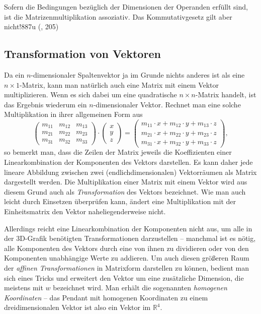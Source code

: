 Sofern die Bedingungen bezüglich der Dimensionen der Operanden erfüllt sind, ist die Matrizenmultiplikation assoziativ. Das Kommutativgesetz gilt aber nicht!887u (\vgl \citep{bronstein}, 205)

\subsection{Transformation von Vektoren}
Da ein $n$-dimensionaler Spaltenvektor ja im Grunde nichts anderes ist als eine $n \times 1$-Matrix, kann man natürlich auch eine Matrix mit einem Vektor multiplizieren. Wenn es sich dabei um eine quadratische $n \times n$-Matrix handelt, ist das Ergebnis wiederum ein $n$-dimensionaler Vektor. Rechnet man eine solche Multiplikation in ihrer allgemeinen Form aus
\begin{equation}
 \begin{pmatrix}
  m_{11} & m_{12} & m_{13} \\
  m_{21} & m_{22} & m_{23} \\
  m_{31} & m_{32} & m_{33}
 \end{pmatrix} \cdot
 \begin{pmatrix}
  x \\ y \\ z
 \end{pmatrix} =
 \begin{pmatrix}
  m_{11} \cdot x + m_{12} \cdot y + m_{13} \cdot z \\
  m_{21} \cdot x + m_{22} \cdot y + m_{23} \cdot z \\
  m_{31} \cdot x + m_{32} \cdot y + m_{33} \cdot z
 \end{pmatrix},
\end{equation}
so bemerkt man, dass die Zeilen der Matrix jeweils die Koeffizienten einer Linearkombination der Komponenten des Vektors darstellen. Es kann daher jede lineare Abbildung zwischen zwei (endlichdimensionalen) Vektorräumen als Matrix dargestellt werden. Die Multiplikation einer Matrix mit einem Vektor wird aus diesem Grund auch als \emph{Transformation} des Vektors bezeichnet. Wie man auch leicht durch Einsetzen überprüfen kann, ändert eine Multiplikation mit der Einheitsmatrix den Vektor naheliegenderweise nicht.

\label{homogeneouscoordinates}
Allerdings reicht eine Linearkombination der Komponenten nicht aus, um alle in der 3D-Grafik benötigten Transformationen darzustellen -- manchmal ist es nötig, alle Komponenten des Vektors durch eine von ihnen zu dividieren oder von den Komponenten unabhängige Werte zu addieren. Um auch diesen größeren Raum der \emph{affinen Transformationen} in Matrixform darstellen zu können, bedient man sich eines Tricks und erweitert den Vektor um eine zusätzliche Dimension, die meistens mit $w$ bezeichnet wird. Man erhält die sogenannten \emph{homogenen Koordinaten} -- das Pendant mit homogenen Koordinaten zu einem dreidimensionalen Vektor ist also ein Vektor im $\mathbb{R}^4$.

